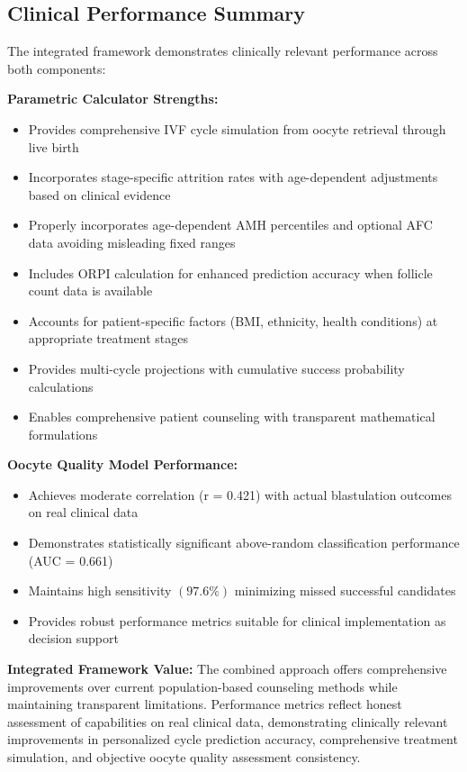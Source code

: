\documentclass[pdflatex,sn-basic]{sn-jnl}%
\begin{document}
\subsection{Clinical Performance Summary}

The integrated framework demonstrates clinically relevant performance across both components:

\textbf{Parametric Calculator Strengths:}
\begin{itemize}
\item Provides comprehensive IVF cycle simulation from oocyte retrieval through live birth
\item Incorporates stage-specific attrition rates with age-dependent adjustments based on clinical evidence
\item Properly incorporates age-dependent AMH percentiles and optional AFC data avoiding misleading fixed ranges
\item Includes ORPI calculation for enhanced prediction accuracy when follicle count data is available
\item Accounts for patient-specific factors (BMI, ethnicity, health conditions) at appropriate treatment stages
\item Provides multi-cycle projections with cumulative success probability calculations
\item Enables comprehensive patient counseling with transparent mathematical formulations
\end{itemize}

\textbf{Oocyte Quality Model Performance:}
\begin{itemize}
\item Achieves moderate correlation (r = 0.421) with actual blastulation outcomes on real clinical data
\item Demonstrates statistically significant above-random classification performance (AUC = 0.661)
\item Maintains high sensitivity $(97.6\%)$ minimizing missed successful candidates
\item Provides robust performance metrics suitable for clinical implementation as decision support
\end{itemize}

\textbf{Integrated Framework Value:}
The combined approach offers comprehensive improvements over current population-based counseling methods while maintaining transparent limitations. Performance metrics reflect honest assessment of capabilities on real clinical data, demonstrating clinically relevant improvements in personalized cycle prediction accuracy, comprehensive treatment simulation, and objective oocyte quality assessment consistency.
\end{document}
